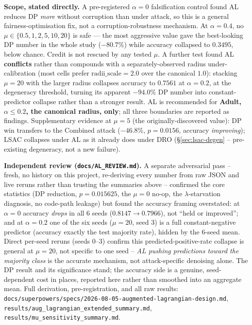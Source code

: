 \documentclass[11pt,a4paper]{article}
\begin{document}
\textbf{Scope, stated directly.} A pre-registered $\alpha{=}0$ falsification
control found AL reduces DP \emph{more} without corruption than under
attack, so this is a general fairness-optimisation fix, not a
corruption-robustness mechanism. At $\alpha{=}0.4$, no $\mu\in\{0.5,1,2,5,10,20\}$
is safe --- the most aggressive value gave the best-looking DP number in the
whole study ($-80.7\%$) while accuracy collapsed to $0.3495$, below chance.
Credit is not rescued by any tested $\mu$. A further test found AL
\textbf{conflicts} rather than compounds with a separately-observed radius
under-calibration (most cells prefer $\mathrm{radii\_scale}{=}2.0$ over the
canonical $1.0$): stacking $\mu{=}20$ with the larger radius collapses
accuracy to $0.7561$ at $\alpha{=}0.2$, at the degeneracy threshold, turning
its apparent $-94.0\%$ DP number into constant-predictor collapse rather than
a stronger result. AL is recommended for \textbf{Adult, $\alpha\le0.2$, the
canonical radius, only}; all three boundaries are reported as findings.
Supplementary evidence at $\mu{=}5$ (the originally-discovered value): DP win
transfers to the Combined attack ($-46.8\%$, $p{=}0.0156$, accuracy
\emph{improving}); LSAC collapses under AL as it already does under DRO
(\S\ref{sec:lsac-degen} -- pre-existing degeneracy, not a new failure).

\textbf{Independent review (\texttt{docs/AL\_REVIEW.md}).} A separate
adversarial pass -- fresh, no history on this project, re-deriving every
number from raw JSON and live reruns rather than trusting the summaries
above -- confirmed the core statistics (DP reduction, $p{=}0.015625$, the
$\mu{=}0$ no-op, the $\lambda$-starvation diagnosis, no code-path leakage)
but found the accuracy framing overstated: at $\alpha{=}0$ accuracy
\emph{drops} in all 6 seeds ($0.8147\to0.7966$), not ``held or improved'';
and at $\alpha{=}0.2$ one of the six seeds ($\mu{=}20$, seed 3) is a full
constant-negative predictor (accuracy exactly the test majority rate),
hidden by the 6-seed mean. Direct per-seed reruns (seeds 0--3) confirm this
predicted-positive-rate collapse is general at $\mu{=}20$, not specific to
one seed -- \emph{AL pushing predictions toward the majority class} is the
accurate mechanism, not attack-specific denoising alone. The DP result and
its significance stand; the accuracy side is a genuine, seed-dependent cost
in places, reported here rather than smoothed into an aggregate mean.
Full derivation, pre-registration, and all raw results:
\texttt{docs/superpowers/specs/2026-08-05-augmented-lagrangian-design.md},
\texttt{results/aug\_lagrangian\_extended\_summary.md},
\texttt{results/mu\_sensitivity\_summary.md}.
\end{document}
